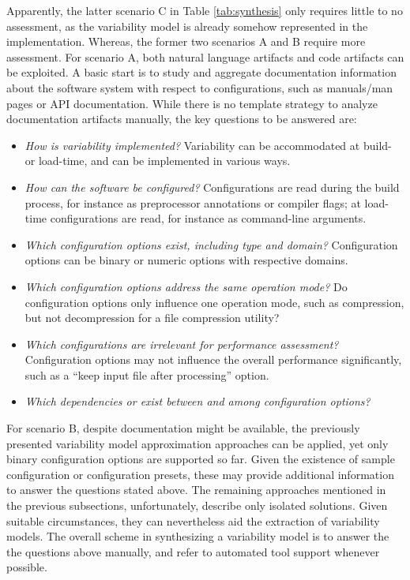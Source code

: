 Apparently, the latter scenario C in Table \ref{tab:synthesis} only requires
little to no assessment, as the variability model is already somehow represented in the implementation.
Whereas, the former two scenarios A and B require more assessment.
For scenario A, both natural language artifacts and code artifacts can be
exploited. A basic start is to study and aggregate documentation information
about the software system with respect to configurations, such as manuals/man
pages or API documentation. While there is no template strategy to analyze
documentation artifacts manually, the key questions to be answered are:

\begin{itemize}
  \item \emph{How is variability implemented?} Variability can be accommodated at
  build- or load-time, and can be implemented in various ways.
  \item \emph{How can the software be configured?} Configurations are read
  during the build process, for instance as preprocessor annotations or compiler
  flags; at load-time configurations are read, for instance as command-line
  arguments.
  \item \emph{Which configuration options exist, including type and domain?}
  Configuration options can be binary or numeric options with respective
  domains.
  \item \emph{Which configuration options address the same operation mode?} Do
  configuration options only influence one operation mode, such as compression,
  but not decompression for a file compression utility?
  \item \emph{Which configurations are irrelevant for performance assessment?}
  Configuration options may not influence the overall performance significantly,
  such as a ``keep input file after processing'' option.
  \item \emph{Which dependencies or exist between and among configuration
  options?}
\end{itemize}
   
For scenario B, despite documentation might be available, the
previously presented variability model approximation approaches
\citep{haslinger_reverse_2011,haslinger_extracting_2013,lopez-herrejon_reverse_2012,linsbauer_feature_2014}
can be applied, yet only binary configuration options are supported so far.
Given the existence of sample configuration or configuration presets, these
may provide additional information to answer the questions stated above. 
The remaining approaches mentioned in the previous subsections, unfortunately,
describe only isolated solutions. Given suitable circumstances, they can
nevertheless aid the extraction of variability models. The overall scheme in
synthesizing a variability model is to answer the the questions above manually,
and refer to automated tool support whenever possible.



